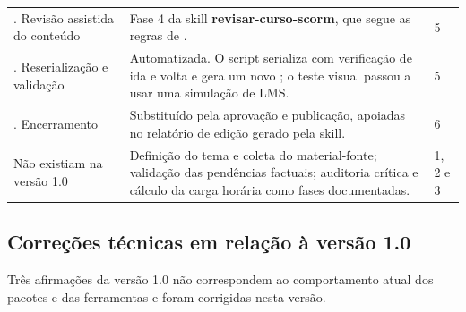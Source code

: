 \documentclass[12pt,a4paper]{article}
\newcommand{\skill}[1]{\textsf{\textbf{#1}}}
\begin{document}
\begin{longtable}{@{}L{0.27\textwidth}L{0.55\textwidth}C{0.12\textwidth}@{}}
. Revisão assistida do conteúdo &
Fase 4 da skill \skill{revisar-curso-scorm}, que segue as regras de . & 5 \\
. Reserialização e validação &
Automatizada. O script  serializa com verificação de ida e volta e gera um novo ; o teste visual passou a usar uma simulação de LMS. & 5 \\
. Encerramento &
Substituído pela aprovação e publicação, apoiadas no relatório de edição gerado pela skill. & 6 \\
\addlinespace
Não existiam na versão 1.0 &
Definição do tema e coleta do material-fonte; validação das pendências factuais; auditoria crítica e cálculo da carga horária como fases documentadas. & 1, 2 e 3 \\
\end{longtable}
\endgroup

\subsection{Correções técnicas em relação à versão 1.0}

Três afirmações da versão 1.0 não correspondem ao comportamento atual dos pacotes e das ferramentas e foram corrigidas nesta versão.
\end{document}
